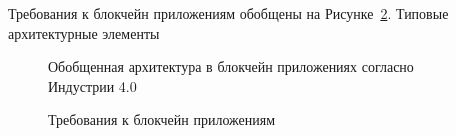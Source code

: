 Требования к блокчейн приложениям обобщены на Рисунке~\cref{fig:blockchhainreq}. Типовые архитектурные элементы  


\begin{figure}[ht]
    \caption{Обобщенная архитектура в блокчейн приложениях согласно Индустрии 4.0}\label{fig:blockchhain}
\end{figure}

\begin{figure}[ht]
    \caption{Требования к блокчейн приложениям}\label{fig:blockchhainreq}
\end{figure}


